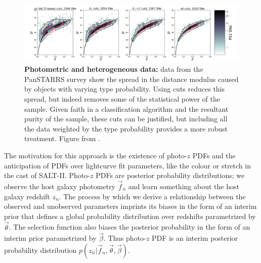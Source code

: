 \documentclass[12pt, onecolumn]{emulateapj}
\begin{document}
\begin{figure}
\begin{center}
\includegraphics[width=1.0\textwidth]{fig/PanSTARRS.png}
\caption{{\bf Photometric and heterogeneous data:} data from the PanSTARRS survey show the spread in the distance modulus caused by objects with varying type probability. Using cuts reduces this spread, but indeed removes some of the statistical power of the sample. Given faith in a classification algorithm and the resultant purity of the sample, these cuts can be justified, but including all the data weighted by the type probability provides a more robust treatment. Figure from \cite{jones}. 
\label{fig:intro}}
\end{center}
\end{figure}

The motivation for this approach is the existence of photo-$z$ PDFs and the anticipation of PDFs over lightcurve fit parameters, like the colour or stretch in the cast of SALT-II.  Photo-$z$ PDFs are posterior probability distributions; we observe the host galaxy photometry $\vec{f}_{n}$ and learn something about the host galaxy redshift $z_{n}$.  The process by which we derive a relationship between the observed and unobserved parameters imprints its biases in the form of an interim prior that defines a global probability distribution over redshifts parametrized by $\vec{\theta}$.  The selection function also biases the posterior probability in the form of an interim prior parametrized by $\vec{\beta}$.  Thus photo-$z$ PDF is an interim posterior probability distribution $p(z_{n} | \vec{f}_{n}, \vec{\theta}, \vec{\beta})$.
\end{document}

